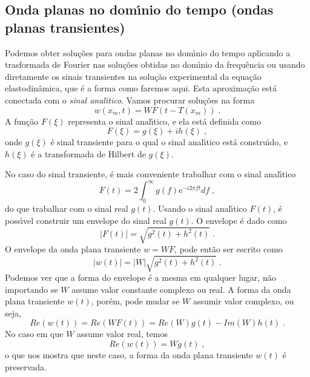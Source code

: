 \subsection{Onda planas no dom\'{\i}nio do tempo (ondas planas
transientes)}

Podemos obter solu\c{c}\~oes para ondas planas no dom\'{\i}nio do
tempo aplicando a trasformada de Fourier nas solu\c{c}\~oes
obtidas no dom\'{\i}nio da frequ\^encia ou usando diretamente
os sinais transientes na
solu\c{c}\~ao experimental da equa\c{c}\~ao elastodin\^amica,
que \'e a forma como faremos aqui.
Esta aproxima\c{c}\~ao est\'a conectada com o {\it sinal
anal\'{\i}tico}. Vamos procurar solu\c{c}\~oes na forma
\begin{equation}
w(x_m,t)=W F(t-T(x_m)) \;.
\end{equation}
A fun\c{c}\~ao $F(\xi)$ representa o sinal anal\'{\i}tico, e ela
est\'a definida como
\begin{equation}
F(\xi)=g(\xi)+ih(\xi) \;,
\end{equation}
onde $g(\xi)$ \'e sinal transiente para o qual o sinal
anal\'{\i}tico est\'a constru\'{\i}do, e $h(\xi)$ \'e a
transformada de Hilbert de $g(\xi)$.

No caso do sinal transiente, \'e mais conveniente trabalhar com o
sinal anal\'{\i}tico
\begin{equation}
F(t)=2 \int_0^{\infty} g(f) \mathrm{e}^{-i2\pi f t} df \;,
\end{equation}
do que trabalhar com o sinal real $g(t)$. Usando o sinal
anal\'{\i}tico $F(t)$, \'e poss\'{\i}vel construir um envelope do
sinal real $g(t)$. O envelope \'e dado como
\begin{equation}
|F(t)|=\sqrt{g^2(t)+h^2(t)} \;.
\end{equation}
O envelope da onda plana transiente $w = WF$, pode ent\~ao ser
escrito como
\begin{equation}
|w(t)|=|W|\sqrt{g^2(t)+h^2(t)} \;.
\end{equation}
Podemos ver que a forma do envelope \'e a mesma em qualquer lugar,
n\~ao importando se $W$ assume valor constante complexo ou real. A
forma da onda plana transiente $w(t)$, por\'em, pode mudar se $W$
assumir valor complexo, ou seja,
\begin{equation}
Re(w(t))=Re(WF(t))=Re(W)g(t)-Im(W)h(t) \;.
\end{equation}
No caso em que $W$ assume valor real, temos
\begin{equation}
Re(w(t))=Wg(t) \;,
\end{equation}
o que nos mostra que neste caso, a forma da onda plana transiente
$w(t)$ \'e preservada.

